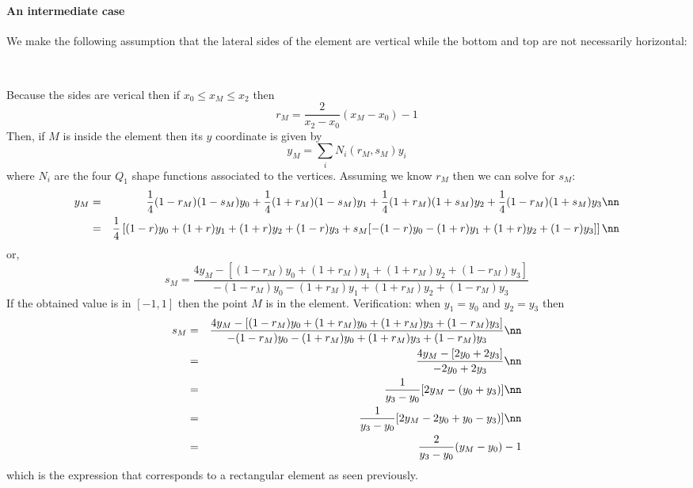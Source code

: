 \begin{center}
\\
\end{center}


\paragraph{An intermediate case} We make the following assumption that the lateral sides of the  
element are vertical while the bottom and top are not necessarily horizontal:

\begin{center}
\\
\end{center}

Because the sides are verical then if $x_0 \leq x_M \leq x_2$ then 
\[
r_M = \frac{2}{x_2-x_0}(x_M-x_0) -1 
\]
Then, if $M$ is inside the element then its $y$ coordinate is given by
\[
y_M = \sum_i N_i(r_M,s_M) y_i
\]
where $N_i$ are the four $Q_1$ shape functions associated to the vertices.
Assuming we know $r_M$ then we can solve for $s_M$:
\begin{eqnarray}
y_M &=&  
\frac{1}{4}(1-r_M)(1-s_M) y_0+
\frac{1}{4}(1+r_M)(1-s_M) y_1+
\frac{1}{4}(1+r_M)(1+s_M) y_2+
\frac{1}{4}(1-r_M)(1+s_M) y_3 \nn\\
&=& 
\frac{1}{4} \left[
(1-r)y_0+(1+r)y_1+(1+r)y_2+(1-r)y_3 +s_M [ -(1-r)y_0 - (1+r)y_1+(1+r)y_2+(1-r)y_3  ] 
\right] \nn 
\end{eqnarray}
or, 
\[
s_M = \frac{ 4y_M - [(1-r_M)y_0+(1+r_M)y_1+(1+r_M)y_2+(1-r_M)y_3]  }{ -(1-r_M)y_0 -(1+r_M)y_1+(1+r_M)y_2+(1-r_M)y_3 } 
\]
If the obtained value is in $[-1,1]$ then the point $M$ is in the element.
Verification: when $y_1=y_0$ and $y_2=y_3$ then 
\begin{eqnarray}
s_M 
&=& \frac{4 y_M - [(1-r_M)y_0+(1+r_M)y_0+(1+r_M)y_3+(1-r_M)y_3]  }{ -(1-r_M)y_0 - (1+r_M)y_0+(1+r_M)y_3+(1-r_M)y_3 } \nn\\
&=& \frac{4 y_M - [ 2 y_0 + 2 y_3]  }{ -2 y_0 + 2 y_3    }  \nn\\
&=& \frac{1}{y_3-y_0} [2 y_M - (  y_0 +  y_3) ] \nn\\ 
&=& \frac{1}{y_3-y_0} [2 y_M -  2 y_0 +y_0 -  y_3)  ] \nn\\ 
&=& \frac{2}{y_3-y_0} (y_M - y_0) - 1 
\end{eqnarray}
which is the expression that corresponds to a rectangular element as seen previously.

